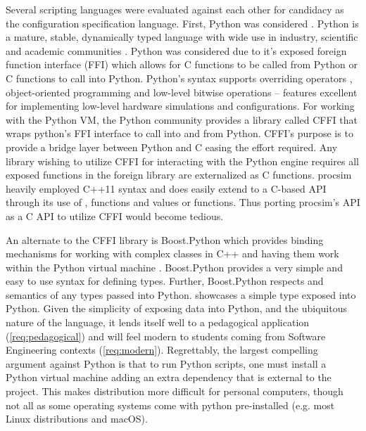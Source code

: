 Several scripting languages were evaluated against each other for candidacy as the configuration specification language. First, Python was considered \cite{Python:Homepage}. Python is a mature, stable, dynamically typed language with wide use in industry, scientific and academic communities \cite{StackOverflowSurvey2016}. Python was considered due to it's exposed foreign function interface (FFI) which allows for C functions to be called from Python or C functions to call into Python. Python's syntax supports overriding operators \cite{Python:Operators}, object-oriented programming \cite{Python:Classes} and low-level bitwise operations \cite{Python:BuiltinTypes} -- features excellent for implementing low-level hardware simulations and configurations. For working with the Python VM, the Python community provides a library called CFFI that wraps python's FFI interface to call into and from Python. CFFI's purpose is to provide a bridge layer between Python and C easing the effort required. Any library wishing to utilize CFFI for interacting with the Python engine requires all exposed functions in the foreign library are externalized as C functions. procsim heavily employed C++11 syntax and does easily extend to a C-based API through its use of ,  functions and  values or functions. Thus porting procsim's API as a C API to utilize CFFI would become tedious. 

An alternate to the CFFI library is Boost.Python which provides binding mechanisms for working with complex classes in C++ and having them work within the Python virtual machine \cite{Boost1.53.0:Python}. Boost.Python provides a very simple and easy to use syntax for defining types. Further, Boost.Python respects  and  semantics of any types passed into Python.  showcases a simple type exposed into Python. Given the simplicity of exposing data into Python, and the ubiquitous nature of the language, it lends itself well to a pedagogical application (\cref{req:pedagogical}) and will feel modern to students coming from Software Engineering contexts (\cref{req:modern}). Regrettably, the largest compelling argument against Python is that to run Python scripts, one must install a Python virtual machine adding an extra dependency that is external to the project. This makes distribution more difficult for personal computers, though not all as some operating systems come with python pre-installed (e.g. most Linux distributions and macOS).


